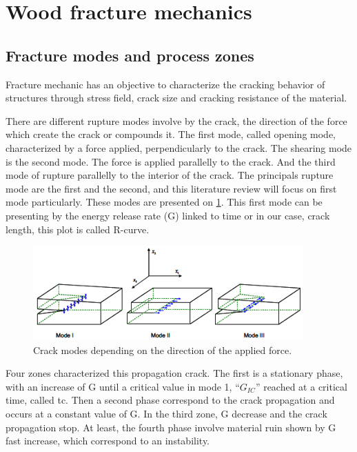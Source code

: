 \section{Wood fracture mechanics}


\subsection{Fracture modes and process zones}

Fracture mechanic has an objective to characterize the cracking behavior of structures through stress field, crack size and cracking resistance of the material.

There are different rupture modes involve by the crack, the direction of the force which create the crack or compounds it. The first mode, called opening mode, characterized by a force applied, perpendicularly to the crack. The shearing mode is the second mode. The force is applied parallelly to the crack. And the third mode of rupture parallelly to the interior of the crack. The principals rupture mode are the first and the second, and this literature review will focus on first mode particularly. These modes are presented on \ref{fig:Fig3}. This first mode can be presenting by the energy release rate (G) linked to time or in our case, crack length, this plot is called R-curve.
\begin{figure}[th]
	\centering
	\includegraphics{Figures/Mode_presentation}
	\decoRule
	\caption[Crack modes]{Crack modes depending on the direction of the applied force.}
	\label{fig:Fig3}
\end{figure}
Four zones characterized this propagation crack. The first is a stationary phase, with an increase of G until a critical value in mode 1, “$G_{IC}$” reached at a critical time, called tc. Then a second phase correspond to the crack propagation and occurs at a constant value of G. In the third zone, G decrease and the crack propagation stop. At least, the fourth phase involve material ruin shown by G fast increase, which correspond to an instability.

